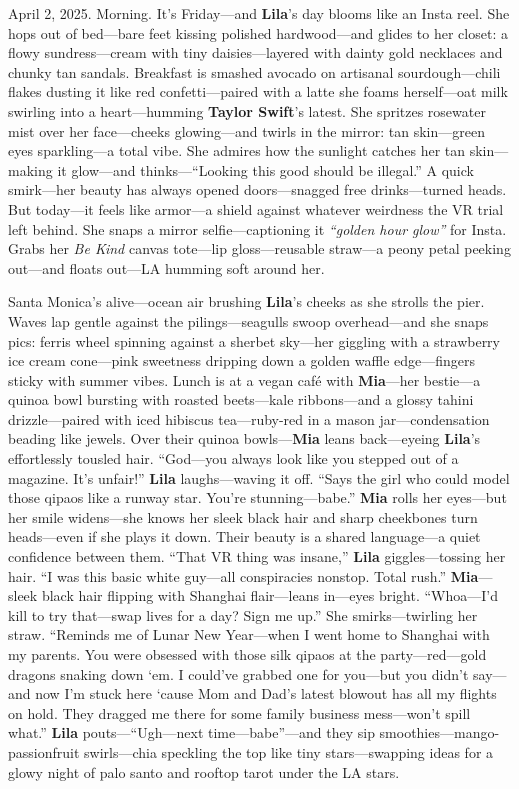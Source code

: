 \documentclass{article}
\begin{document}
April 2, 2025. Morning. It’s Friday—and \textbf{Lila}’s day blooms like an Insta reel. She hops out of bed—bare feet kissing polished hardwood—and glides to her closet: a flowy sundress—cream with tiny daisies—layered with dainty gold necklaces and chunky tan sandals. Breakfast is smashed avocado on artisanal sourdough—chili flakes dusting it like red confetti—paired with a latte she foams herself—oat milk swirling into a heart—humming \textbf{Taylor Swift}’s latest. She spritzes rosewater mist over her face—cheeks glowing—and twirls in the mirror: tan skin—green eyes sparkling—a total vibe. She admires how the sunlight catches her tan skin—making it glow—and thinks—“Looking this good should be illegal.” A quick smirk—her beauty has always opened doors—snagged free drinks—turned heads. But today—it feels like armor—a shield against whatever weirdness the VR trial left behind. She snaps a mirror selfie—captioning it \textit{“golden hour glow”} for Insta. Grabs her \textit{Be Kind} canvas tote—lip gloss—reusable straw—a peony petal peeking out—and floats out—LA humming soft around her.

Santa Monica’s alive—ocean air brushing \textbf{Lila}’s cheeks as she strolls the pier. Waves lap gentle against the pilings—seagulls swoop overhead—and she snaps pics: ferris wheel spinning against a sherbet sky—her giggling with a strawberry ice cream cone—pink sweetness dripping down a golden waffle edge—fingers sticky with summer vibes. Lunch is at a vegan café with \textbf{Mia}—her bestie—a quinoa bowl bursting with roasted beets—kale ribbons—and a glossy tahini drizzle—paired with iced hibiscus tea—ruby-red in a mason jar—condensation beading like jewels. Over their quinoa bowls—\textbf{Mia} leans back—eyeing \textbf{Lila}’s effortlessly tousled hair. “God—you always look like you stepped out of a magazine. It’s unfair!” \textbf{Lila} laughs—waving it off. “Says the girl who could model those qipaos like a runway star. You’re stunning—babe.” \textbf{Mia} rolls her eyes—but her smile widens—she knows her sleek black hair and sharp cheekbones turn heads—even if she plays it down. Their beauty is a shared language—a quiet confidence between them. “That VR thing was insane,” \textbf{Lila} giggles—tossing her hair. “I was this basic white guy—all conspiracies nonstop. Total rush.” \textbf{Mia}—sleek black hair flipping with Shanghai flair—leans in—eyes bright. “Whoa—I’d kill to try that—swap lives for a day? Sign me up.” She smirks—twirling her straw. “Reminds me of Lunar New Year—when I went home to Shanghai with my parents. You were obsessed with those silk qipaos at the party—red—gold dragons snaking down ‘em. I could’ve grabbed one for you—but you didn’t say—and now I’m stuck here ‘cause Mom and Dad’s latest blowout has all my flights on hold. They dragged me there for some family business mess—won’t spill what.” \textbf{Lila} pouts—“Ugh—next time—babe”—and they sip smoothies—mango-passionfruit swirls—chia speckling the top like tiny stars—swapping ideas for a glowy night of palo santo and rooftop tarot under the LA stars.
\end{document}
